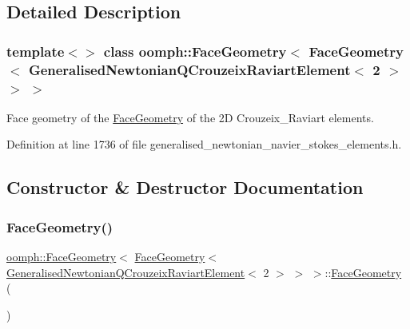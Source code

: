 \subsection{Detailed Description}
\subsubsection*{template$<$$>$\newline
class oomph\+::\+Face\+Geometry$<$ Face\+Geometry$<$ Generalised\+Newtonian\+Q\+Crouzeix\+Raviart\+Element$<$ 2 $>$ $>$ $>$}

Face geometry of the \hyperlink{classoomph_1_1FaceGeometry}{Face\+Geometry} of the 2D Crouzeix\+\_\+\+Raviart elements. 

Definition at line 1736 of file generalised\+\_\+newtonian\+\_\+navier\+\_\+stokes\+\_\+elements.\+h.



\subsection{Constructor \& Destructor Documentation}
\mbox{\label{classoomph_1_1FaceGeometry_3_01FaceGeometry_3_01GeneralisedNewtonianQCrouzeixRaviartElement_3_012_01_4_01_4_01_4_a4c83f5ec3c93fb63078eaac71a8765cd}} 
\subsubsection{\texorpdfstring{Face\+Geometry()}{FaceGeometry()}}
{\footnotesize\ttfamily \hyperlink{classoomph_1_1FaceGeometry}{oomph\+::\+Face\+Geometry}$<$ \hyperlink{classoomph_1_1FaceGeometry}{Face\+Geometry}$<$ \hyperlink{classoomph_1_1GeneralisedNewtonianQCrouzeixRaviartElement}{Generalised\+Newtonian\+Q\+Crouzeix\+Raviart\+Element}$<$ 2 $>$ $>$ $>$\+::\hyperlink{classoomph_1_1FaceGeometry}{Face\+Geometry} (\begin{DoxyParamCaption}{ }\end{DoxyParamCaption})\hspace{0.3cm}{\ttfamily [inline]}}



